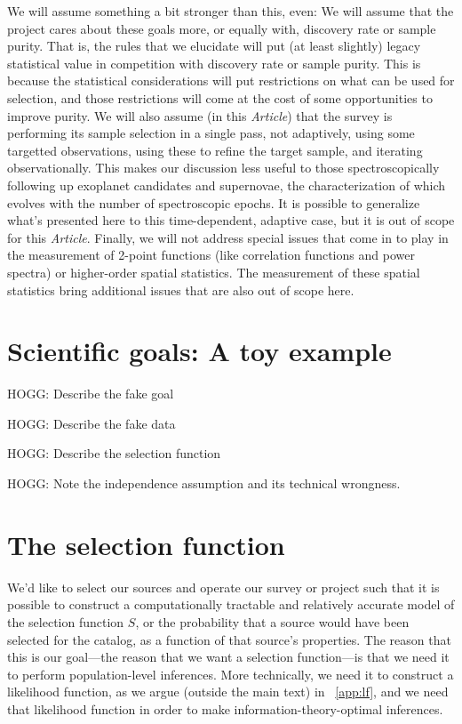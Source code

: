 \documentclass[modern]{aastex62}
\newcommand{\documentname}{\textsl{Article}}
\begin{document}
We will assume something a bit stronger than this, even:
We will assume that the project cares about these goals more,
or equally with, discovery rate or sample purity.
That is, the rules that we elucidate will put (at least slightly)
legacy statistical value in competition with discovery rate or sample
purity.
This is because the statistical considerations will put restrictions
on what can be used for selection, and those restrictions will come at
the cost of some opportunities to improve purity.
We will also assume (in this \documentname) that the survey is performing
its sample selection in a single pass, not adaptively, using some
targetted observations, using these to refine the target sample, and
iterating observationally.
This makes our discussion less useful to those spectroscopically following up exoplanet
candidates and supernovae, the characterization of which evolves with
the number of spectroscopic epochs.
It is possible to generalize what's presented here to this time-dependent, adaptive
case, but it is out of scope for this \documentname.
Finally, we will not address special issues that come in to play in the
measurement of 2-point functions (like correlation functions and power
spectra) or higher-order spatial statistics.
The measurement of these spatial statistics bring additional issues
that are also out of scope here.

\section{Scientific goals: A toy example}\label{sec:toy}

HOGG: Describe the fake goal

HOGG: Describe the fake data

HOGG: Describe the selection function

HOGG: Note the independence assumption and its technical wrongness.

\section{The selection function}\label{sec:sf}

We'd like to select our sources and operate our survey or project such
that it is possible to construct a computationally tractable and
relatively accurate model of the selection function $S$, or the
probability that a source would have been selected for the catalog, as
a function of that source's properties.
The reason that this is our goal---the reason that we want a selection
function---is that we need it to perform population-level inferences.
More technically, we need it to construct a likelihood function, as we
argue (outside the main text)
in \appendixname~\ref{app:lf}, and we need that likelihood
function in order to make information-theory-optimal inferences.
\end{document}
